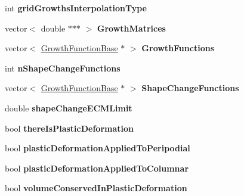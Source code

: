 \begin{DoxyCompactItemize}
\item 
\hypertarget{classSimulation_a6a4bbc66c4a2bb43de57509d25ce6ac4}{}int {\bfseries grid\+Growths\+Interpolation\+Type}\label{classSimulation_a6a4bbc66c4a2bb43de57509d25ce6ac4}

\item 
\hypertarget{classSimulation_a8cdab34c42a949aeeaa2b76fe5cf7d76}{}vector$<$ double $\ast$$\ast$$\ast$ $>$ {\bfseries Growth\+Matrices}\label{classSimulation_a8cdab34c42a949aeeaa2b76fe5cf7d76}

\item 
\hypertarget{classSimulation_a88e857983b0152e32b969dfd3ed72fdc}{}vector$<$ \hyperlink{classGrowthFunctionBase}{Growth\+Function\+Base} $\ast$ $>$ {\bfseries Growth\+Functions}\label{classSimulation_a88e857983b0152e32b969dfd3ed72fdc}

\item 
\hypertarget{classSimulation_a74251252e9f320268055537749d674c1}{}int {\bfseries n\+Shape\+Change\+Functions}\label{classSimulation_a74251252e9f320268055537749d674c1}

\item 
\hypertarget{classSimulation_a92ba3cb43bcbabf7e617755a28cb648b}{}vector$<$ \hyperlink{classGrowthFunctionBase}{Growth\+Function\+Base} $\ast$ $>$ {\bfseries Shape\+Change\+Functions}\label{classSimulation_a92ba3cb43bcbabf7e617755a28cb648b}

\item 
\hypertarget{classSimulation_a5869e105b5d4d2e41c071f24988b314e}{}double {\bfseries shape\+Change\+E\+C\+M\+Limit}\label{classSimulation_a5869e105b5d4d2e41c071f24988b314e}

\item 
\hypertarget{classSimulation_ab0d54e9e505f3701cf5ca8b0ac0df00a}{}bool {\bfseries there\+Is\+Plastic\+Deformation}\label{classSimulation_ab0d54e9e505f3701cf5ca8b0ac0df00a}

\item 
\hypertarget{classSimulation_abf2cb97bd129a14b21e15b742af8768c}{}bool {\bfseries plastic\+Deformation\+Applied\+To\+Peripodial}\label{classSimulation_abf2cb97bd129a14b21e15b742af8768c}

\item 
\hypertarget{classSimulation_a42218fdf4e2a624fd4886edb39125251}{}bool {\bfseries plastic\+Deformation\+Applied\+To\+Columnar}\label{classSimulation_a42218fdf4e2a624fd4886edb39125251}

\item 
\hypertarget{classSimulation_a0e44e881245a507dc96188a8934b3bcc}{}bool {\bfseries volume\+Conserved\+In\+Plastic\+Deformation}\label{classSimulation_a0e44e881245a507dc96188a8934b3bcc}


\end{DoxyCompactItemize}
